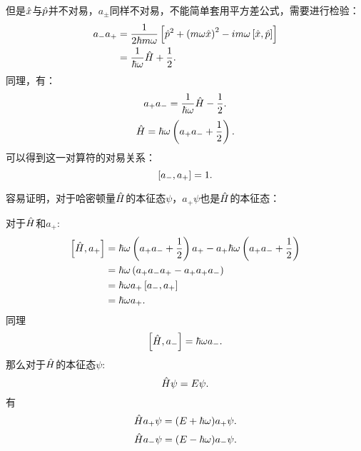 但是$\hat{x}$与$\hat{p}$并不对易，$a_{\pm}$同样不对易，不能简单套用平方差公式，需要进行检验：
\begin{equation}
    \begin{aligned}
        a_-a_+&=\frac{1}{2\hbar m\omega}\left[\hat{p}^2+\left(m\omega\hat{x}\right)^2-im\omega\left[\hat{x},\hat{p}\right]\right]\\
        &=\frac{1}{\hbar\omega}\hat{H}+\frac{1}{2}.
    \end{aligned}
\end{equation}
同理，有：
\begin{equation}
    a_+a_-=\frac{1}{\hbar\omega}\hat{H}-\frac{1}{2}.
\end{equation}
\begin{equation}
    \hat{H}=\hbar\omega\left(a_+a_-+\frac{1}{2}\right).
\end{equation}
可以得到这一对算符的对易关系：
\begin{equation}
    \left[a_-,a_+\right]=1.
\end{equation}

容易证明，对于哈密顿量$\hat{H}$的本征态$\psi$，$a_+\psi$也是$\hat{H}$的本征态：

\begin{graybox}[Proof]
    对于$\hat{H}$和$a_+$:
    \begin{equation}
        \begin{aligned}
            \left[\hat{H},a_+\right]&=\hbar\omega\left(a_+a_-+\frac{1}{2}\right)a_+-a_+\hbar\omega\left(a_+a_-+\frac{1}{2}\right)\\
            &=\hbar\omega\left(a_+a_-a_+-a_+a_+a_-\right)\\
            &=\hbar\omega a_+\left[a_-,a_+\right]\\
            &=\hbar\omega a_+.
        \end{aligned}
    \end{equation}
    同理
    \begin{equation}
        \left[\hat{H},a_-\right]=\hbar\omega a_-.
    \end{equation}
    那么对于$\hat{H}$的本征态$\psi$:
    \begin{equation}
        \hat{H}\psi=E\psi.
    \end{equation}
    有 
    \begin{equation}
        \hat{H}a_+\psi=(E+\hbar\omega)a_+\psi.
    \end{equation}
    \begin{equation}
        \hat{H}a_-\psi=(E-\hbar\omega)a_-\psi.
    \end{equation}
\end{graybox}


